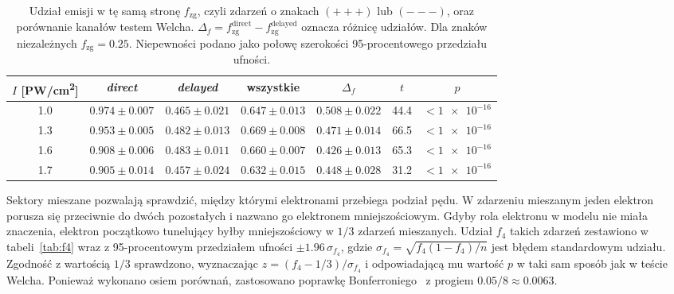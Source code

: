 \documentclass[12pt,a4paper]{article}
\newcommand{\PWcm}{PW/cm\textsuperscript{2}}
\begin{document}
\begin{table}[htbp]
  \centering
  \small
  \setlength{\tabcolsep}{4pt}
  \caption{Udział emisji w tę samą stronę $f_{\mathrm{zg}}$, czyli
  zdarzeń o znakach $(+{+}+)$ lub $(-{-}-)$, oraz porównanie kanałów
  testem Welcha.
  $\Delta_{f}=f_{\mathrm{zg}}^{\mathrm{direct}}-f_{\mathrm{zg}}^{\mathrm{delayed}}$
  oznacza różnicę udziałów. Dla znaków niezależnych
  $f_{\mathrm{zg}}=\num{0.25}$. Niepewności podano jako połowę szerokości 95-procentowego
  przedziału ufności.}
  \label{tab:fzg}
  \begin{tabular}{ccccccc}
    \toprule
    $I$ [\PWcm] & \emph{direct} & \emph{delayed} & wszystkie
      & $\Delta_{f}$ & $t$ & $p$ \\
    \midrule
    \num{1.0} & $\num{0.974}\pm\num{0.007}$ & $\num{0.465}\pm\num{0.021}$ & $\num{0.647}\pm\num{0.013}$ & $\num{0.508}\pm\num{0.022}$ & \num{44.4} & $<\num{1e-16}$ \\
    \num{1.3} & $\num{0.953}\pm\num{0.005}$ & $\num{0.482}\pm\num{0.013}$ & $\num{0.669}\pm\num{0.008}$ & $\num{0.471}\pm\num{0.014}$ & \num{66.5} & $<\num{1e-16}$ \\
    \num{1.6} & $\num{0.908}\pm\num{0.006}$ & $\num{0.483}\pm\num{0.011}$ & $\num{0.660}\pm\num{0.007}$ & $\num{0.426}\pm\num{0.013}$ & \num{65.3} & $<\num{1e-16}$ \\
    \num{1.7} & $\num{0.905}\pm\num{0.014}$ & $\num{0.457}\pm\num{0.024}$ & $\num{0.632}\pm\num{0.015}$ & $\num{0.448}\pm\num{0.028}$ & \num{31.2} & $<\num{1e-16}$ \\
    \bottomrule
  \end{tabular}
\end{table}

Sektory mieszane pozwalają sprawdzić, między którymi elektronami
przebiega podział pędu. W zdarzeniu mieszanym jeden elektron porusza
się przeciwnie do dwóch pozostałych i nazwano go elektronem
mniejszościowym. Gdyby rola elektronu w modelu nie miała znaczenia,
elektron początkowo tunelujący byłby mniejszościowy w $1/3$ zdarzeń
mieszanych. Udział $f_4$ takich zdarzeń zestawiono
w tabeli~\ref{tab:f4} wraz z 95-procentowym przedziałem ufności
$\pm\num{1.96}\,\sigma_{f_4}$, gdzie $\sigma_{f_4}=\sqrt{f_4(1-f_4)/n}$
jest błędem standardowym udziału. Zgodność z wartością $1/3$ sprawdzono,
wyznaczając $z=(f_4-1/3)/\sigma_{f_4}$ i odpowiadającą mu wartość $p$
w taki sam sposób jak w teście Welcha. Ponieważ wykonano osiem
porównań, zastosowano poprawkę Bonferroniego~\cite{Dunn1961} z progiem
$\num{0.05}/8\approx\num{0.0063}$.
\end{document}
